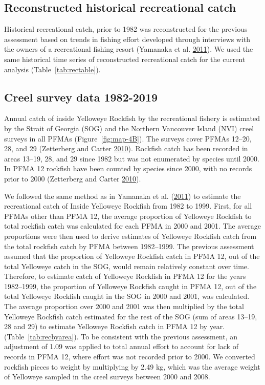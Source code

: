 \documentclass[11pt]{book}
\begin{document}
\hypertarget{sec:recon-rec-catch-data}{%
\subsection{Reconstructed historical recreational catch}\label{sec:recon-rec-catch-data}}

Historical recreational catch, prior to 1982 was reconstructed for the previous assessment based on trends in fishing effort developed through interviews with the owners of a recreational fishing resort (Yamanaka et al. \protect\hyperlink{ref-yamanaka2011}{2011}). We used the same historical time series of reconstructed recreational catch for the current analysis (Table~\ref{tab:rectable}).

\hypertarget{sec:creel-catch-data}{%
\subsection{Creel survey data 1982-2019}\label{sec:creel-catch-data}}

Annual catch of inside Yelloweye Rockfish by the recreational fishery is estimated by the Strait of Georgia (SOG) and the Northern Vancouver Island (NVI) creel surveys in all PFMAs (Figure~\ref{fig:map-4B}). The surveys cover PFMAs 12--20, 28, and 29 (Zetterberg and Carter \protect\hyperlink{ref-zetterberg2010}{2010}). Rockfish catch has been recorded in areas 13--19, 28, and 29 since 1982 but was not enumerated by species until 2000. In PFMA 12 rockfish have been counted by species since 2000, with no records prior to 2000 (Zetterberg and Carter \protect\hyperlink{ref-zetterberg2010}{2010}).

We followed the same method as in Yamanaka et al. (\protect\hyperlink{ref-yamanaka2011}{2011}) to estimate the recreational catch of Inside Yelloweye Rockfish from 1982 to 1999. First, for all PFMAs other than PFMA 12, the average proportion of Yelloweye Rockfish to total rockfish catch was calculated for each PFMA in 2000 and 2001. The average proportions were then used to derive estimates of Yelloweye Rockfish catch from the total rockfish catch by PFMA between 1982--1999. The previous assessment assumed that the proportion of Yelloweye Rockfish catch in PFMA 12, out of the total Yelloweye catch in the SOG, would remain relatively constant over time. Therefore, to estimate catch of Yelloweye Rockfish in PFMA 12 for the years 1982--1999, the proportion of Yelloweye Rockfish caught in PFMA 12, out of the total Yelloweye Rockfish caught in the SOG in 2000 and 2001, was calculated. The average proportion over 2000 and 2001 was then multiplied by the total Yelloweye Rockfish catch estimated for the rest of the SOG (sum of areas 13--19, 28 and 29) to estimate Yelloweye Rockfish catch in PFMA 12 by year. (Table~\ref{tab:recbyarea}). To be consistent with the previous assessment, an adjustment of 1.09 was applied to total annual effort to account for lack of records in PFMA 12, where effort was not recorded prior to 2000. We converted rockfish pieces to weight by multiplying by 2.49 kg, which was the average weight of Yelloweye sampled in the creel surveys between 2000 and 2008.
\end{document}
